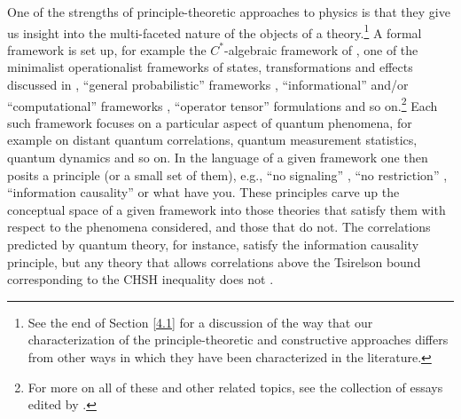 One of the strengths of principle-theoretic approaches to physics is that they give us insight into the multi-faceted nature of the objects of a theory.\footnote{See the end of Section \ref{4.1} for a discussion of the way that our characterization of the principle-theoretic and constructive approaches differs from other ways in which they have been characterized in the literature.} A formal framework is set up, for example the $C^*$-algebraic framework of \citet[]{CBH}, one of the minimalist operationalist frameworks of states, transformations and effects discussed in \citet[]{Myrvold 2010}, ``general probabilistic'' frameworks \citep[]{Koberinski and Mueller 2018}, ``informational'' and/or ``computational'' frameworks \citep[]{Chiribella and Ebler 2019}, ``operator tensor'' formulations \citep[]{Hardy 2012} and so on.\footnote{For more on all of these and other related topics, see the collection of essays edited by \citet[]{Chiribella and Spekkens 2016}.} Each such framework focuses on a particular aspect of quantum phenomena, for example on distant quantum correlations, quantum measurement statistics, quantum dynamics and so on. In the language of a given framework one then posits a principle (or a small set of them), e.g., ``no signaling'' \citep[]{Popescu and Rohrlich 1994}, ``no restriction'' \citep[]{Chiribella et al 2010}, ``information causality'' \citep[]{Pawlowski et al 2009} or what have you. These principles carve up the conceptual space of a given framework into those theories that satisfy them with respect to the phenomena considered, and those that do not. The correlations predicted by quantum theory, for instance, satisfy the information causality principle, but any theory that allows correlations above the Tsirelson bound corresponding to the CHSH inequality does not \citep[for discussion, see][]{Cuffaro 2018}.


